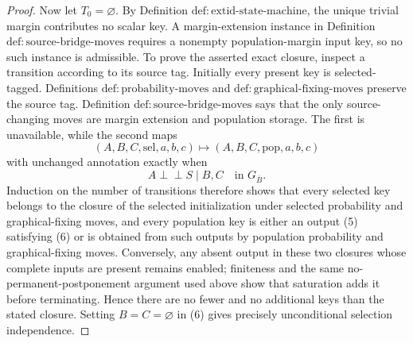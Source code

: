 \documentclass{article}
\begin{document}
\begin{proof}
Now let \(T_0=\varnothing\).  By Definition \(\mathrm{def{:}extid\text{-}state\text{-}machine}\), the unique trivial margin contributes no scalar key.  A margin-extension instance in Definition \(\mathrm{def{:}source\text{-}bridge\text{-}moves}\) requires a nonempty population-margin input key, so no such instance is admissible.  To prove the asserted exact closure, inspect a transition according to its source tag.  Initially every present key is selected-tagged.  Definitions \(\mathrm{def{:}probability\text{-}moves}\) and \(\mathrm{def{:}graphical\text{-}fixing\text{-}moves}\) preserve the source tag.  Definition \(\mathrm{def{:}source\text{-}bridge\text{-}moves}\) says that the only source-changing moves are margin extension and population storage.  The first is unavailable, while the second maps
\[
(A,B,C,\mathrm{sel},a,b,c)
\longmapsto
(A,B,C,\mathrm{pop},a,b,c) \tag{5}
\]
with unchanged annotation exactly when
\[
A\perp\!\!\!\perp S\mid B,C
\quad\text{in }G_{\overline B}. \tag{6}
\]
Induction on the number of transitions therefore shows that every selected key belongs to the closure of the selected initialization under selected probability and graphical-fixing moves, and every population key is either an output (5) satisfying (6) or is obtained from such outputs by population probability and graphical-fixing moves.  Conversely, any absent output in these two closures whose complete inputs are present remains enabled; finiteness and the same no-permanent-postponement argument used above show that saturation adds it before terminating.  Hence there are no fewer and no additional keys than the stated closure.  Setting \(B=C=\varnothing\) in (6) gives precisely unconditional selection independence.


\end{proof}
\end{document}

